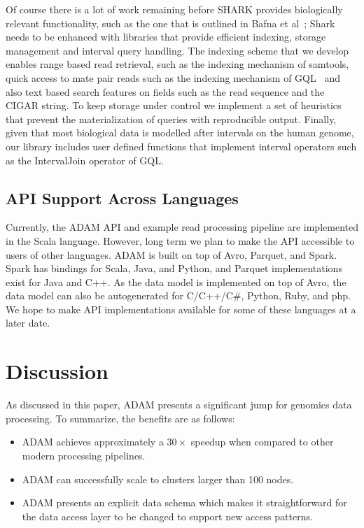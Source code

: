 \documentclass[10pt,twocolumn]{article}
\theoremstyle{plain}
\begin{document}
Of course there is a lot of work remaining before SHARK provides biologically relevant functionality,
such as the one that is outlined in Bafna et al~\cite{bafna2013}; Shark needs to be enhanced with libraries that provide
efficient indexing, storage management and interval query handling. The indexing scheme that we develop enables
range based read retrieval, such as the indexing mechanism of samtools, quick access to mate pair reads such as the
indexing mechanism of GQL~\cite{kozanitis13} and also text based search features on fields such as the read sequence
and the CIGAR string. To keep storage under control we implement a set of heuristics that prevent the materialization of
queries with reproducible output. Finally, given that most biological data is modelled after intervals on the human genome,
our library includes user defined functions that implement interval operators such as the IntervalJoin operator of GQL.

\subsection{API Support Across Languages}
\label{sec:api-support-across-languages}

Currently, the ADAM API and example read processing pipeline are implemented in the Scala language. However, long
term we plan to make the API accessible to users of other languages. ADAM is built on top of Avro, Parquet, and Spark.
Spark has bindings for Scala, Java, and Python, and Parquet implementations exist for Java and C++. As the data model
is implemented on top of Avro, the data model can also be auto\-generated for C/C++/C\#, Python, Ruby, and php. We hope
to make API implementations available for some of these languages at a later date.

\section{Discussion}
\label{sec:discussion}

As discussed in this paper, ADAM presents a significant jump for genomics data processing. To summarize, the benefits are as
follows:

\begin{itemize}
\item ADAM achieves approximately a $30\times$ speedup when compared to other modern processing pipelines.
\item ADAM can successfully scale to clusters larger than 100 nodes.
\item ADAM presents an explicit data schema which makes it straightforward for the data access layer to be changed
to support new access patterns.
\end{itemize}
\end{document}
